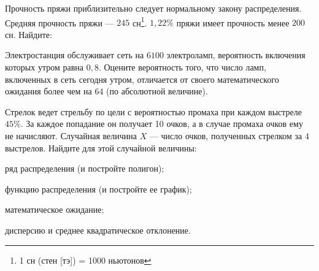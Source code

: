 \vfil

\begin{zkrPlain}{25}\noindent 
	Прочность пряжи приблизительно следует нормальному закону распределения. Средняя прочность пряжи — $245$ сн\footnote{1 сн (стен [тэ]) = 1000 ньютонов}. $1{,}22\%$ пряжи имеет прочность менее $200$ сн. Найдите: \par {}
 
\end{zkrPlain}

\vfil

\begin{zkrPlain}{25}\noindent 
	Электростанция обслуживает сеть на $ 6100 $ электроламп, вероятность включения которых утром равна $ 0{,}8 $. Оцените вероятность того, что число ламп, включенных в сеть сегодня утром, отличается от своего математического ожидания более чем на $ 64 $ (по абсолютной величине). 
 
\end{zkrPlain}

\newpage\setcounter{zad}{0}\setcounter{footnote}{0}



\begin{zkrPlain}{25}\noindent 
	Стрелок ведет стрельбу по цели с вероятностью промаха при каждом выстреле $45\%$. За каждое попадание он получает 10 очков, а в случае промаха очков ему не начисляют. Случайная величина $X$ --- число очков, полученных стрелком за 4 выстрелов.  Найдите для этой случайной величины: \par \smallskip\small{ \par \zz ряд распределения (и постройте полигон); \par \zz функцию распределения (и постройте ее график); \par \zz математическое ожидание; \par \zz дисперсию и среднее квадратическое отклонение.\par \par}
 
\end{zkrPlain}

\vfil

